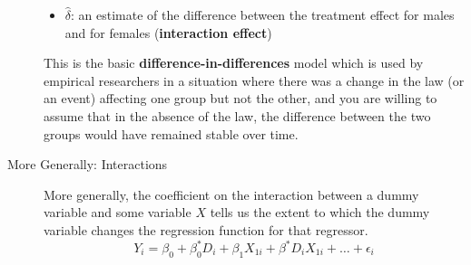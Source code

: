 \documentclass[a4paper,10pt,landscape]{article}
\begin{document}
\begin{multicols*}{3}
\begin{description}
\begin{itemize}[itemsep=0.5pt]
		\item $\hat{\delta}$: an estimate of the difference between the treatment effect for males and for females ({\bf\color{blue}interaction effect})
	\end{itemize}
	This is the basic {\bf difference-in-differences} model which is used by empirical researchers in a situation where there was a change in the law (or an event) affecting one group but not the other, and you are willing to assume that in the absence of the law, the difference between the two groups would have remained stable over time.
	\item[More Generally: Interactions] More generally, the coefficient on the interaction between a dummy variable and some variable $X$ tells us the extent to which the dummy variable changes the regression function for that regressor.
	$$Y_i=\beta_0+\beta_0^*D_i+\beta_1X_{1i}+\beta^*D_iX_{1i}+\dots+\epsilon_i$$
\end{description}


\end{multicols*}
\end{document}
